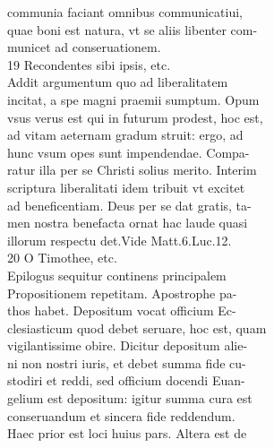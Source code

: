 \documentclass{article}
\begin{document}
\begin{pages}
                communia faciant omnibus communicatiui, \\
                quae boni est natura, vt se aliis libenter com- \\
                municet ad conseruationem. \\
                19 Recondentes sibi ipsis, etc. \\
                Addit argumentum quo ad liberalitatem \\
                incitat, a spe magni praemii sumptum. Opum \\
                vsus verus est qui in futurum prodest, hoc est, \\
                ad vitam aeternam gradum struit: ergo, ad \\
                hunc vsum opes sunt impendendae. Compa- \\
                ratur illa per se Christi solius merito. Interim \\
                scriptura liberalitati idem tribuit vt excitet \\
                ad beneficentiam. Deus per se dat gratis, ta- \\
                men nostra benefacta ornat hac laude quasi \\
                illorum respectu det.Vide Matt.6.Luc.12. \\
                20 O Timothee, etc. \\
                Epilogus sequitur continens principalem \\
                Propositionem repetitam. Apostrophe pa- \\
                thos habet. Depositum vocat officium Ec- \\
                clesiasticum quod debet seruare, hoc est, quam \\
                vigilantissime obire. Dicitur depositum alie- \\
                ni non nostri iuris, et debet summa fide cu- \\
                stodiri et reddi, sed officium docendi Euan- \\
                gelium est depositum: igitur summa cura est \\
                conseruandum et sincera fide reddendum. \\
                Haec prior est loci huius pars. Altera est de \\

\end{pages}
\end{document}
